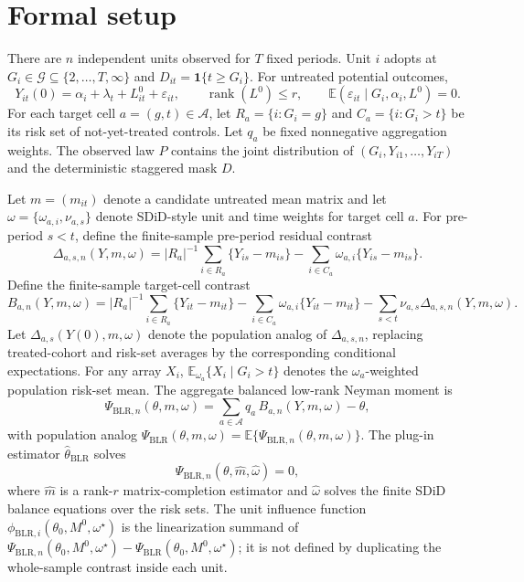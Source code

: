 \documentclass[11pt]{article}
\newcommand{\E}{\mathbb{E}}
\newcommand{\one}{\mathbf{1}}
\theoremstyle{definition}
\theoremstyle{plain}
\theoremstyle{remark}
\begin{document}
\section{Formal setup}\label{sec:setup}
There are $n$ independent units observed for $T$ fixed periods. Unit $i$ adopts
at $G_i\in\mathcal G\subseteq\{2,\ldots,T,\infty\}$ and
$D_{it}=\one\{t\ge G_i\}$. For untreated potential outcomes,
\[
  Y_{it}(0)=\alpha_i+\lambda_t+L^0_{it}+\varepsilon_{it},
  \qquad \operatorname{rank}(L^0)\le r,\qquad
  \E(\varepsilon_{it}\mid G_i,\alpha_i,L^0)=0.
\]
For each target cell $a=(g,t)\in\mathcal A$, let $R_a=\{i:G_i=g\}$ and
$C_a=\{i:G_i>t\}$ be its risk set of not-yet-treated controls. Let
$q_a$ be fixed nonnegative aggregation weights. The observed law $P$ contains
the joint distribution of $(G_i,Y_{i1},\ldots,Y_{iT})$ and the deterministic
staggered mask $D$.

Let $m=(m_{it})$ denote a candidate untreated mean matrix and let
$\omega=\{\omega_{a,i},\nu_{a,s}\}$ denote SDiD-style unit and time weights for
target cell $a$. For pre-period $s<t$, define the finite-sample pre-period
residual contrast
\[
  \Delta_{a,s,n}(Y,m,\omega)=
  |R_a|^{-1}\sum_{i\in R_a}\{Y_{is}-m_{is}\}
  -\sum_{i\in C_a}\omega_{a,i}\{Y_{is}-m_{is}\}.
\]
Define the finite-sample target-cell contrast
\[
  B_{a,n}(Y,m,\omega)=
  |R_a|^{-1}\sum_{i\in R_a}\{Y_{it}-m_{it}\}
  -\sum_{i\in C_a}\omega_{a,i}\{Y_{it}-m_{it}\}
  -\sum_{s<t}\nu_{a,s}\Delta_{a,s,n}(Y,m,\omega).
\]
Let $\Delta_{a,s}(Y(0),m,\omega)$ denote the population analog of
$\Delta_{a,s,n}$, replacing treated-cohort and risk-set averages by the
corresponding conditional expectations. For any array $X_i$,
$\E_{\omega_a}\{X_i\mid G_i>t\}$ denotes the $\omega_a$-weighted population
risk-set mean.
The aggregate balanced low-rank Neyman moment is
\[
  \Psi_{\mathrm{BLR},n}(\theta,m,\omega)
  =\sum_{a\in\mathcal A}q_a\,B_{a,n}(Y,m,\omega)-\theta,
\]
with population analog $\Psi_{\mathrm{BLR}}(\theta,m,\omega)=
\E\{\Psi_{\mathrm{BLR},n}(\theta,m,\omega)\}$. The plug-in estimator
$\widehat\theta_{\mathrm{BLR}}$ solves
\[
  \Psi_{\mathrm{BLR},n}(\theta,\widehat m,\widehat\omega)=0,
\]
where $\widehat m$ is a rank-$r$ matrix-completion estimator and
$\widehat\omega$ solves the finite SDiD balance equations over the risk sets.
The unit influence function $\phi_{\mathrm{BLR},i}(\theta_0,M^0,\omega^\star)$
is the linearization summand of
$\Psi_{\mathrm{BLR},n}(\theta_0,M^0,\omega^\star)-
\Psi_{\mathrm{BLR}}(\theta_0,M^0,\omega^\star)$; it is not defined by
duplicating the whole-sample contrast inside each unit.
\end{document}
